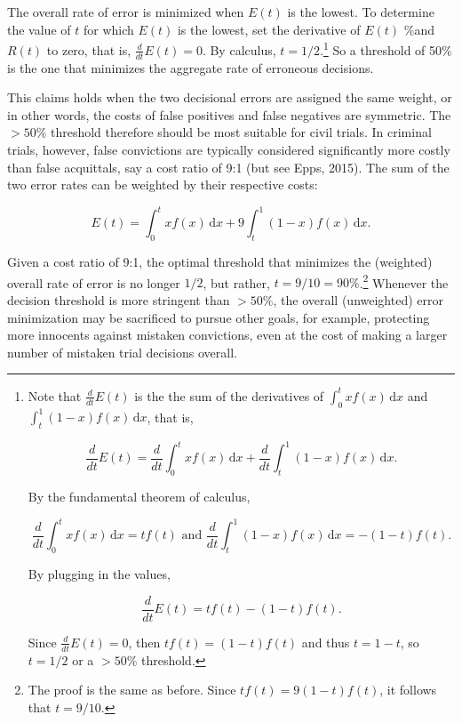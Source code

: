 \documentclass[10pt,dvipsnames]{scrartcl}
\begin{document}
The overall rate of error is minimized when \(E(t)\) is the lowest. To
determine the value of \(t\) for which \(E(t)\) is the lowest, set the
derivative of \(E(t)\) \%and \(R(t)\) to zero, that is,
\(\frac{d}{dt} E(t)= 0\). By calculus,
\(t=1/2\).\footnote{Note that $\frac{d}{dt}  E(t)$ is the the sum of the derivatives of $\int_0^t \! x f(x) \, \mathrm{d}x$ 
and 
$\int_t^1 \!(1-x) f(x) \, \mathrm{d}x$, that is,

\[\frac{d}{dt} E(t) = \frac{d}{dt}  \int_0^t \! x f(x) \, \mathrm{d}x + \frac{d}{dt}  \int_t^1 \! (1-x) f(x) \, \mathrm{d}x.\]

By the fundamental theorem of calculus, 

\[\frac{d}{dt}   \int_0^t \! x f(x) \, \mathrm{d}x = tf(t) \text{ and }
\frac{d}{dt}   \int_t^1 \! (1-x) f(x) \, \mathrm{d}x = -(1-t)f(t). \]

By plugging in the values, 

\[\frac{d}{dt}  E(t) = tf(t)  -(1-t)f(t). \]

Since $\frac{d}{dt}  E(t)= 0$, then $tf(t)  = (1-t)f(t)$
and thus
$t  = 1-t$, so 
$t  = 1/2$ or a $>50\%$ threshold.
} So a threshold of 50\% is the one that minimizes the aggregate rate of
erroneous decisions.

This claims holds when the two decisional errors are assigned the same
weight, or in other words, the costs of false positives and false
negatives are symmetric. The \(>50\%\) threshold therefore should be
most suitable for civil trials. In criminal trials, however, false
convictions are typically considered significantly more costly than
false acquittals, say a cost ratio of 9:1 (but see Epps, 2015). The sum
of the two error rates can be weighted by their respective costs:

\[E(t) = \int_0^t \! x f(x) \, \mathrm{d}x + 9\int_t^1 \! (1-x) f(x) \, \mathrm{d}x.
\]

Given a cost ratio of 9:1, the optimal threshold that minimizes the
(weighted) overall rate of error is no longer \(1/2\), but rather,
\(t=9/10=90\%\).\footnote{The proof is the same as before. Since $tf(t)  = 9(1-t)f(t)$, it follows that 
$t  = 9/10$.} Whenever the decision threshold is more stringent than
\(>50\%\), the overall (unweighted) error minimization may be sacrificed
to pursue other goals, for example, protecting more innocents against
mistaken convictions, even at the cost of making a larger number of
mistaken trial decisions overall.
\end{document}

